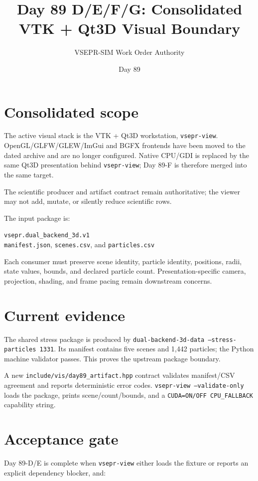 \documentclass[11pt]{article}
\title{Day 89 D/E/F/G: Consolidated VTK + Qt3D Visual Boundary}
\author{VSEPR-SIM Work Order Authority}
\date{Day 89}
\begin{document}
\maketitle

\section*{Consolidated scope}
The active visual stack is the VTK + Qt3D workstation, \texttt{vsepr-view}. OpenGL/GLFW/GLEW/ImGui and BGFX frontends have been moved to the dated archive and are no longer configured. Native CPU/GDI is replaced by the same Qt3D presentation behind \texttt{vsepr-view}; Day 89-F is therefore merged into the same target.

The scientific producer and artifact contract remain authoritative; the viewer may not add, mutate, or silently reduce scientific rows.

The input package is:
\begin{center}
\texttt{vsepr.dual\_backend\_3d.v1}\\
\texttt{manifest.json}, \texttt{scenes.csv}, and \texttt{particles.csv}
\end{center}
Each consumer must preserve scene identity, particle identity, positions, radii, state values, bounds, and declared particle count. Presentation-specific camera, projection, shading, and frame pacing remain downstream concerns.

\section*{Current evidence}
The shared stress package is produced by \texttt{dual-backend-3d-data --stress-particles 1331}. Its manifest contains five scenes and 1,442 particles; the Python machine validator passes. This proves the upstream package boundary.

A new \texttt{include/vis/day89\_artifact.hpp} contract validates manifest/CSV agreement and reports deterministic error codes. \texttt{vsepr-view --validate-only} loads the package, prints scene/count/bounds, and a \texttt{CUDA=ON/OFF CPU\_FALLBACK} capability string.

\newpage
\section*{Acceptance gate}
Day 89-D/E is complete when \texttt{vsepr-view} either loads the fixture or reports an explicit dependency blocker, and:
\end{document}
